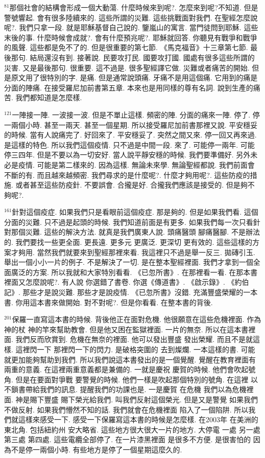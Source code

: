 \documentclass{book}
\begin{document}
$^{81}$那個社會的結構會形成一個大動蕩.
什麼時候來到呢?.
怎麼來到呢?不知道.
但是警號響起.
會有很多陸續來的.
這些所謂的災難.
這些挑戰面對我們.
在聖經怎麼說呢?.
我們只拿一段.
就是耶穌基督自己說的.
鑒嵐山的寓言.
當門徒問到耶穌.
這些末後的事.
什麼時候會成就?.
會有什麼預兆呢?.
耶穌就回答.
你聽見有戰爭和戰爭的風聲.
這些都是免不了的.
但是很重要的第七節.
《馬克福音》十三章第七節.
最後那句.
結局還沒有到.
接著說.
民要攻打民.
國要攻打國.
國處有很多這些所謂的災害.
又是最後那句.
很重要.
這不過是.
很多聖經譯它做.
災難或者痛苦的開始.
但是原文用了很特別的字.
是痛.
但是通常說頭痛.
牙痛不是用這個痛.
它用到的痛是分面的陣痛.
在接受羅尼加前書第五章.
本來也是用同樣的尊有名詞.
說到生產的痛苦.
我們都知道是怎麼樣.

$^{121}$一陣接一陣.
一波接一波.
但是不單止這樣.
頻密的陣.
分面的痛來一陣.
停了.
停一兩個小時.
甚至一兩天.
甚至一個星期.
所以接受羅尼加前書那裡又說.
平安穩妥的時候.
當有人說痛完了.
好回來了.
平安穩妥了.
突然之間又來.
停一回又再來過.
是這樣的特色.
所以我們這個疫情.
只不過是中間一段.
來了.
可能停一兩年.
可能停三四年.
但是不要以為一切安好.
當人說平靜安穩的時候.
我們要準備好.
另外未必是疫情.
可能是第二樣來的.
因為這樣.
無論未來學.
無論聖經都說.
我們前面會不斷的有.
而且越來越頻密.
我們尋求的是什麼呢?.
什麼才夠用呢?.
這些防疫的措施.
或者甚至這些防疫針.
不要誤會.
合攏是好.
合攏我們應該是接受的.
但是夠不夠呢?.

$^{161}$針對這個疫症.
如果我們只是看眼前這個疫症.
那是夠的.
但是如果我們看.
這個分面的災難.
只不過是起頭的時候.
我們知道前面是有更多.
如果我們每一次只看針對那個災難.
這些的解決方法.
就真是我們廣東人說.
頭痛醫頭 腳痛醫腳.
不是辦法的.
我們要找一些更全面.
更長遠.
更多元 更廣泛.
更深切 更有效的.
這些這樣的方案才夠用.
當然我們就要來到聖經那裡來看.
我這裡只不過是舉一反三.
拋磚引玉.
舉出一個小小一片的例子.
不是解決了一切.
是在整本聖經裡面.
我們才拿到一個全面廣泛的方案.
所以我就和大家特別看看.
《已忽所書》.
在那裡看一看.
在那本書裡面又怎麼說呢?.
有人說 你選錯了書卷.
你選《傳道書》.
《啟示錄》.
《約伯記》.
那些才是說災難.
那些才是說疫情.
《已忽所書》沒錯.
充滿豐盛榮耀的一本書.
你用這本書來做開始.
對不對呢?.
但是你看看.
在整本書的背後.

$^{201}$保羅一直寫這本書的時候.
背後他正在面對危機.
他很願意在這些危機裡面.
作為神的杖 神的竿來幫助教會.
但是他又困在監獄裡面.
一片的無奈.
所以在這本書裡面.
我們反而欣賞到.
危機在無奈的裡面.
他可以發出豐盛 發出榮耀.
而且不是就這樣.
這裡閃一下 那裡閃一下的閃力.
是破格突圍的 去到燦爛.
一本這樣的書.
可能就更加能夠幫助到我們.
所以我們說這本書發出的是一個覺醒.
覺醒在教育裡面有兩重的意義.
在這裡兩重意義都是兼備的.
一就是慶祝 慶賀的時候.
他們會吹起號角.
但是在要面對爭戰 要警覺的時候.
他們一樣是吹起那個特別的號角.
在這裡 以不鎖書帶給我們的訊息.
提醒我們的功課也是.
一是慶賀 在危機 我們以為危機裡面.
神是賜下豐盛 賜下榮光給我們.
叫我們反射這個榮光.
但是又是警覺 如果我們不做反射.
如果我們懵然不知的話.
我們就會在危機裡面 陷入了一個陷阱.
所以我們就這樣來感受一下.
感受一下保羅寫這本書的時候是怎麼樣.
在2003年 在美洲的東北角.
包括紐約州 安大略省.
這些地方很大很大一片的地方.
大停電 一處 另一處 第三處 第四處.
這些電纜全部停了.
在一片漆黑裡面 是很多不方便.
是很害怕的 因為不是停一兩個小時.
有些地方是停了一個星期這麼久的.
\end{document}
